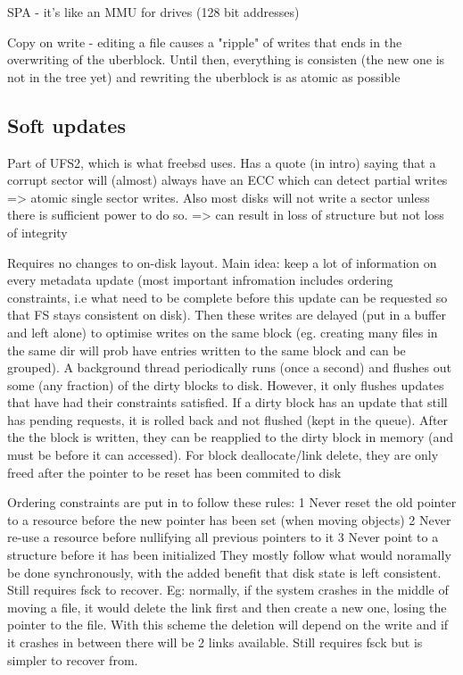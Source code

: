 \documentclass[a4paper]{article}
\begin{document}
        SPA - it's like an MMU for drives (128 bit addresses)

        Copy on write - editing a file causes a "ripple" of writes that ends in
        the overwriting of the uberblock. Until then, everything is consisten
        (the new one is not in the tree yet) and rewriting the uberblock is as
        atomic as possible

    \subsection{Soft updates}

        Part of UFS2, which is what freebsd uses. Has a quote (in intro) saying
        that a corrupt sector will (almost) always have an ECC which can detect
        partial writes => atomic single sector writes. Also most disks will not
        write a sector unless there is sufficient power to do so.
        => can result in loss of structure but not loss of integrity

        Requires no changes to on-disk layout. Main idea: keep a lot of
        information on every metadata update (most important infromation
        includes ordering constraints, i.e what need to be complete before this
        update can be requested so that FS stays consistent on disk). Then
        these writes are delayed (put in a buffer and left alone) to optimise
        writes on the same block (eg. creating many files in the same dir will
        prob have entries written to the same block and can be grouped). A
        background thread periodically runs (once a second) and flushes out
        some (any fraction) of the dirty blocks to disk. However, it only
        flushes updates that have had their constraints satisfied. If a dirty
        block has an update that still has pending requests, it is rolled back
        and not flushed (kept in the queue). After the the block is written,
        they can be reapplied to the dirty block in memory (and must be before
        it can accessed). For block deallocate/link delete, they are only freed
        after the pointer to be reset has been commited to disk

        Ordering constraints are put in to follow these rules:
          1 Never reset the old pointer to a resource before the new pointer has
            been set (when moving objects)
          2 Never re-use a resource before nullifying all previous pointers to
            it
          3 Never point to a structure before it has been initialized
        They mostly follow what would noramally be done synchronously, with the
        added benefit that disk state is left consistent. Still requires fsck
        to recover. Eg: normally, if the system crashes in the middle of moving
        a file, it would delete the link first and then create a new one,
        losing the pointer to the file. With this scheme the deletion will
        depend on the write and if it crashes in between there will be 2 links
        available. Still requires fsck but is simpler to recover from.
\end{document}

